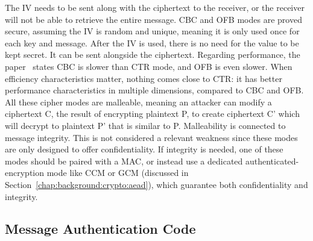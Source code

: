The \ac{IV} needs to be sent along with the ciphertext to the receiver, or the receiver will not be able to retrieve the entire message.
\ac{CBC} and \ac{OFB} modes are proved secure, assuming the \ac{IV} is random and unique, meaning it is only used once for each key and message.
After the \ac{IV} is used, there is no need for the value to be kept secret. It can be sent alongside the ciphertext.
Regarding performance, the paper~\cite{aesmodes} states \ac{CBC} is slower than \ac{CTR} mode, and \ac{OFB} is even slower.
When efficiency characteristics matter, nothing comes close to \ac{CTR}: it has better performance characteristics in multiple dimensions, compared to \ac{CBC} and \ac{OFB}.
All these cipher modes are malleable, meaning an attacker can modify a ciphertext C, the result of encrypting plaintext P, to create ciphertext C' which will decrypt to plaintext P' that is similar to P. Malleability is connected to message integrity. This is not considered a relevant weakness since these modes are only designed to offer confidentiality. If integrity is needed, one of these modes should be paired with a \ac{MAC}, or instead use a dedicated authenticated-encryption mode like \ac{CCM} or \ac{GCM} (discussed in Section~\ref{chap:background:crypto:aead}), which guarantee both confidentiality and integrity.



\subsection{Message Authentication Code}\label{chap:background:crypto:mac}

